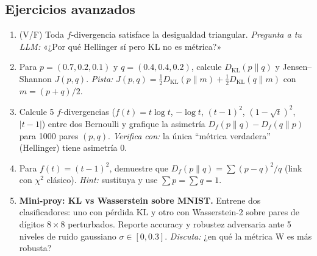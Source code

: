 \subsection*{Ejercicios avanzados}
\begin{enumerate}[resume]
	\item[$\star$] (V/F) Toda $f$-divergencia satisface la desigualdad triangular. \textit{Pregunta a tu LLM:} «¿Por qué Hellinger sí pero KL no es métrica?»
	\item[$\star\star$] Para $p=(0.7,0.2,0.1)$ y $q=(0.4,0.4,0.2)$, calcule $D_{\mathrm{KL}}(p\|q)$ y Jensen--Shannon $J(p,q)$. \textit{Pista:} $J(p,q)=\tfrac{1}{2} D_{\mathrm{KL}}(p\|m)+\tfrac{1}{2} D_{\mathrm{KL}}(q\|m)$ con $m=(p+q)/2$.
	\item[$\star\star$] Calcule 5 $f$-divergencias ($f(t)=t\log t$, $-\log t$, $(t-1)^2$, $(1-\sqrt{t})^2$, $|t-1|$) entre dos Bernoulli y grafique la asimetría $D_f(p\|q)-D_f(q\|p)$ para 1000 pares $(p,q)$. \textit{Verifica con:} la única ``métrica verdadera'' (Hellinger) tiene asimetría 0.
	\item[$\star\star\star$] Para $f(t)=(t-1)^2$, demuestre que $D_f(p\|q)=\sum(p-q)^2/q$ (link con $\chi^2$ clásico). \textit{Hint:} sustituya y use $\sum p=\sum q=1$.
	\item[$\star\star\star\star$] \textbf{Mini-proy: KL vs Wasserstein sobre MNIST.} Entrene dos clasificadores: uno con pérdida KL y otro con Wasserstein-2 sobre pares de dígitos $8\times 8$ perturbados. Reporte accuracy y robustez adversaria ante 5 niveles de ruido gaussiano $\sigma\in[0,0.3]$. \textit{Discuta:} ¿en qué la métrica W es más robusta?
\end{enumerate}

